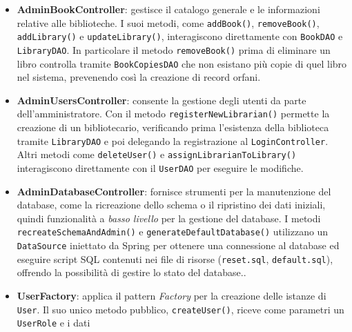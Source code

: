 \documentclass[
  italian,
  paper=a4,
  ,captions=tableheading
]{scrbook}
\newcommand{\passthrough}[1]{#1}
\begin{document}
\begin{itemize}
\begin{lstlisting}[language=Java, language=Java, caption={Metodo che dimostra la logica dietro al prestito di una copia.}, label={lst:librarianbookcontroller}, label=lst:librarianbookcontroller]
      if (dueDate == null) {
          return libraryFacade.borrowBook(member, copy);
      } else {
          return libraryFacade.borrowBook(member, copy, dueDate);
      }
  }
\end{lstlisting}
\item
  \textbf{AdminBookController}: gestisce il catalogo generale e le
  informazioni relative alle biblioteche. I suoi metodi, come
  \passthrough{\lstinline!addBook()!},
  \passthrough{\lstinline!removeBook()!},
  \passthrough{\lstinline!addLibrary()!} e
  \passthrough{\lstinline!updateLibrary()!}, interagiscono direttamente
  con \passthrough{\lstinline!BookDAO!} e
  \passthrough{\lstinline!LibraryDAO!}. In particolare il metodo
  \passthrough{\lstinline!removeBook()!} prima di eliminare un libro
  controlla tramite \passthrough{\lstinline!BookCopiesDAO!} che non
  esistano più copie di quel libro nel sistema, prevenendo così la
  creazione di record orfani.
\item
  \textbf{AdminUsersController}: consente la gestione degli utenti da
  parte dell'amministratore. Con il metodo
  \passthrough{\lstinline!registerNewLibrarian()!} permette la creazione
  di un bibliotecario, verificando prima l'esistenza della biblioteca
  tramite \passthrough{\lstinline!LibraryDAO!} e poi delegando la
  registrazione al \passthrough{\lstinline!LoginController!}. Altri
  metodi come \passthrough{\lstinline!deleteUser()!} e
  \passthrough{\lstinline!assignLibrarianToLibrary()!} interagiscono
  direttamente con il \passthrough{\lstinline!UserDAO!} per eseguire le
  modifiche.
\item
  \textbf{AdminDatabaseController}: fornisce strumenti per la
  manutenzione del database, come la ricreazione dello schema o il
  ripristino dei dati iniziali, quindi funzionalità a \emph{basso
  livello} per la gestione del database. I metodi
  \passthrough{\lstinline!recreateSchemaAndAdmin()!} e
  \passthrough{\lstinline!generateDefaultDatabase()!} utilizzano un
  \passthrough{\lstinline!DataSource!} iniettato da Spring per ottenere
  una connessione al database ed eseguire script SQL contenuti nei file
  di risorse (\passthrough{\lstinline!reset.sql!},
  \passthrough{\lstinline!default.sql!}), offrendo la possibilità di
  gestire lo stato del database..
\item
  \textbf{UserFactory}: applica il pattern \emph{Factory} per la
  creazione delle istanze di \passthrough{\lstinline!User!}. Il suo
  unico metodo pubblico, \passthrough{\lstinline!createUser()!}, riceve
  come parametri un \passthrough{\lstinline!UserRole!} e i dati

\end{itemize}
\end{document}
